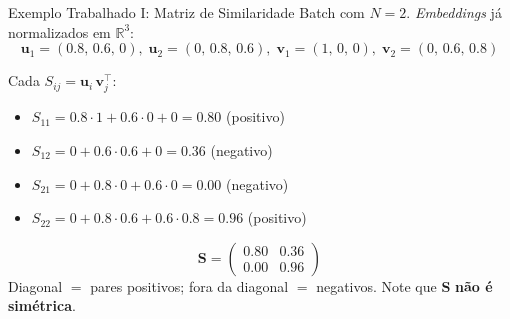 \documentclass[aspectratio=169,xcolor=dvipsnames]{beamer}
\begin{document}
  \begin{frame}{Exemplo Trabalhado I: Matriz de Similaridade}
    Batch com $N=2$. \textit{Embeddings} já normalizados em $\mathbb{R}^3$:
    \[
      \mathbf{u}_1 = (0.8,\, 0.6,\, 0),\;
      \mathbf{u}_2 = (0,\, 0.8,\, 0.6),\;
      \mathbf{v}_1 = (1,\, 0,\, 0),\;
      \mathbf{v}_2 = (0,\, 0.6,\, 0.8)
    \]

    \vspace{0.2em}
    Cada $S_{ij} = \mathbf{u}_i\,\mathbf{v}_j^{\top}$:
    \begin{itemize}\setlength{\itemsep}{0pt}
      \item $S_{11} = 0.8\!\cdot\!1 + 0.6\!\cdot\!0 + 0 = \mathbf{0.80}$ (positivo)
      \item $S_{12} = 0 + 0.6\!\cdot\!0.6 + 0 = \mathbf{0.36}$ (negativo)
      \item $S_{21} = 0 + 0.8\!\cdot\!0 + 0.6\!\cdot\!0 = \mathbf{0.00}$ (negativo)
      \item $S_{22} = 0 + 0.8\!\cdot\!0.6 + 0.6\!\cdot\!0.8 = \mathbf{0.96}$ (positivo)
    \end{itemize}

    \vspace{0.3em}
    \[
      \mathbf{S} = \begin{pmatrix} \mathbf{0.80} & 0.36 \\ 0.00 & \mathbf{0.96} \end{pmatrix}
    \]
    Diagonal $=$ pares positivos; fora da diagonal $=$ negativos. Note que $\mathbf{S}$ \textbf{não é simétrica}.
  \end{frame}
\end{document}
